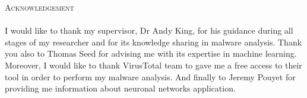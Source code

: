 \textsc{\LARGE Acknowledgement}\\[0.5cm]

\paragraph{}

I would like to thank my supervisor, Dr Andy King, for his guidance during all stages of 
my researcher and for its knowledge sharing in malware analysis.
Thank you also to Thomas Seed for advising me with its expertise in machine learning.
Moreover, I would like to thank VirusTotal team to gave me a free access to their tool
in order to perform my malware analysis.
And finally to Jeremy Pouyet for providing me information about neuronal networks 
application. 

\newpage